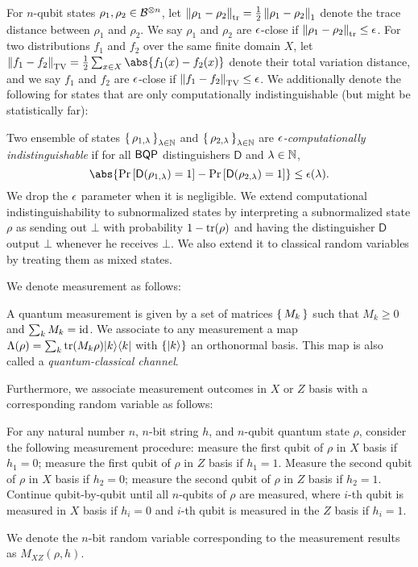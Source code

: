 For $n$-qubit states $\rho_1, \rho_2\in\mathcal{B}^{\otimes n}$,
let $\left\lVert\rho_1-\rho_2\right\rVert_{\mathrm{tr}}=\frac{1}{2}\left\lVert\rho_1-\rho_2\right\rVert_1$ denote the trace distance between $\rho_1$ and $\rho_2$. We say $\rho_1$ and $\rho_2$ are $\epsilon$-close if $\left\lVert\rho_1- \rho_2\right\rVert_{\mathrm{tr}}\leq\epsilon$.
For two distributions $f_1$ and $f_2$ over the same finite domain $X$, let $\norm{f_1-f_2}_{\mathrm{TV}}=\frac{1}{2}\sum_{x\in X}\abs{f_1(x)-f_2(x)}$ denote their total variation distance,
and we say $f_1$ and $f_2$ are $\epsilon$-close if $\left\lVert f_1-f_2\right\rVert_{\mathrm{TV}}\leq\epsilon$.
We additionally denote the following for states that are only computationally indistinguishable (but might be statistically far):
\begin{definition}
\label{def:comp-indis}
    Two ensemble of states $\set{\rho_{1,\lambda}}_{\lambda\in\mathbb{N}}$ and $\set{\rho_{2,\lambda}}_{\lambda\in\mathbb{N}}$ are \emph{$\epsilon$-computationally indistinguishable} if for all $\operatorname{\mathsf{BQP}}$ distinguishers $\mathsf{D}$ and $\lambda\in\mathbb{N}$,
    $$\abs{\Pr\left[\mathsf{D}(\rho_{1,\lambda})=1\right]-\Pr\left[\mathsf{D}(\rho_{2,\lambda})=1\right]}\leq\eps(\lambda).$$
    We drop the $\epsilon$ parameter when it is negligible.
    We extend computational indistinguishability to subnormalized states by interpreting a subnormalized state $\rho$ as sending out $\bot$ with probability $1-\operatorname{tr}(\rho)$ and having the distinguisher $\mathsf{D}$ output $\bot$ whenever he receives $\bot$.
    We also extend it to classical random variables by treating them as mixed states.
\end{definition}

We denote measurement as follows:
\begin{definition} 
    \label{def:QCChannel}
    A quantum measurement is given by a set of matrices $\set{M_k}$ such that $M_k\geq0$ and $\sum_k M_k=\operatorname{id}$.
    We associate to any measurement a map $\Lambda(\rho)=\sum_k \operatorname{tr}(M_k\rho)|k\rangle\langle k|$
    with $\{\ket{k}\}$ an orthonormal basis.
    This map is also called a \emph{quantum-classical channel}.
\end{definition}
Furthermore, we associate measurement outcomes in $X$ or $Z$ basis with a corresponding random variable as follows:
\begin{definition}[$M_{XZ}(\rho,h)$]
	For any natural number $n$, $n$-bit string $h$, and $n$-qubit quantum state $\rho$, consider the following measurement procedure: measure the first qubit of $\rho$ in $X$ basis if $h_1=0$; measure the first qubit of $\rho$ in $Z$ basis if $h_1=1$.  Measure the second qubit of $\rho$ in $X$ basis if $h_2=0$; measure the second qubit of $\rho$ in $Z$ basis if $h_2=1$. Continue qubit-by-qubit until all $n$-qubits of $\rho$ are measured, where $i$-th qubit is measured in $X$ basis if $h_i=0$ and  $i$-th qubit is measured in the $Z$ basis if $h_i=1$.

	We denote the $n$-bit random variable corresponding to the measurement results as $M_{XZ}(\rho,h)$.
\end{definition}


